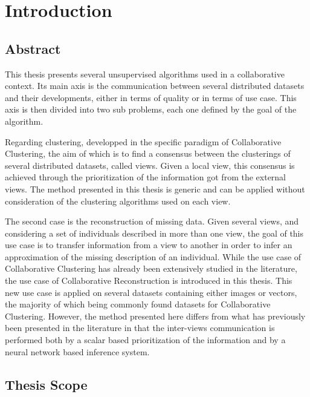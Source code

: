 \chapter{Introduction}

\minitoc{}
\newpage

\section{Abstract}

This thesis presents several unsupervised algorithms used in a collaborative context. Its main axis is the communication between several distributed datasets and their developments, either in terms of quality or in terms of use case. This axis is then divided into two sub problems, each one defined by the goal of the algorithm.

Regarding clustering, developped in the specific paradigm of Collaborative Clustering, the aim of which is to find a consensus between the clusterings of several distributed datasets, called views. Given a local view, this consensus is achieved through the prioritization of the information got from the external views. The method presented in this thesis is generic and can be applied without consideration of the clustering algorithms used on each view.

The second case is the reconstruction of missing data. Given several views, and considering a set of individuals described in more than one view, the goal of this use case is to transfer information from a view to another in order to infer an approximation of the missing description of an individual. While the use case of Collaborative Clustering has already been extensively studied in the literature, the use case of Collaborative Reconstruction is introduced in this thesis. This new use case is applied on several datasets containing either images or vectors, the majority of which being commonly found datasets for Collaborative Clustering. However, the method presented here differs from what has previously been presented in the literature in that the inter-views communication is performed both by a scalar based prioritization of the information and by a neural network based inference system.

\section{Thesis Scope}

